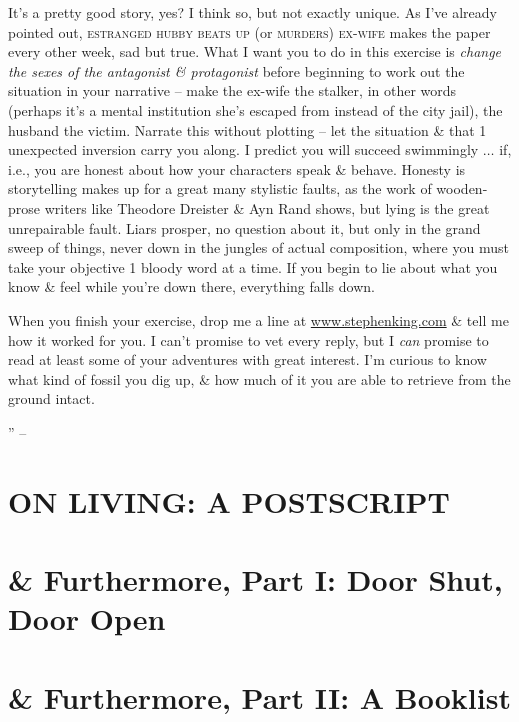 \documentclass{article}
\numberwithin{equation}{section}
\begin{document}
It's a pretty good story, yes? I think so, but not exactly unique. As I've already pointed out, \textsc{estranged hubby beats up} (or \textsc{murders) ex-wife} makes the paper every other week, sad but true. What I want you to do in this exercise is \textit{change the sexes of the antagonist \& protagonist} before beginning to work out the situation in your narrative -- make the ex-wife the stalker, in other words (perhaps it's a mental institution she's escaped from instead of the city jail), the husband the victim. Narrate this without plotting -- let the situation \& that 1 unexpected inversion carry you along. I predict you will succeed swimmingly $\ldots$ if, i.e., you are honest about how your characters speak \& behave. Honesty is storytelling makes up for a great many stylistic faults, as the work of wooden-prose writers like Theodore Dreister \& Ayn Rand shows, but lying is the great unrepairable fault. Liars prosper, no question about it, but only in the grand sweep of things, never down in the jungles of actual composition, where you must take your objective 1 bloody word at a time. If you begin to lie about what you know \& feel while you're down there, everything falls down.

When you finish your exercise, drop me a line at \url{www.stephenking.com} \& tell me how it worked for you. I can't promise to vet every reply, but I \textit{can} promise to read at least some of your adventures with great interest. I'm curious to know what kind of fossil you dig up, \& how much of it you are able to retrieve from the ground intact.

'' -- \cite[pp. 108--107]{King2010}


\section{ON LIVING: A POSTSCRIPT}


\section{\& Furthermore, Part I: Door Shut, Door Open}


\section{\& Furthermore, Part II: A Booklist}
\end{document}
